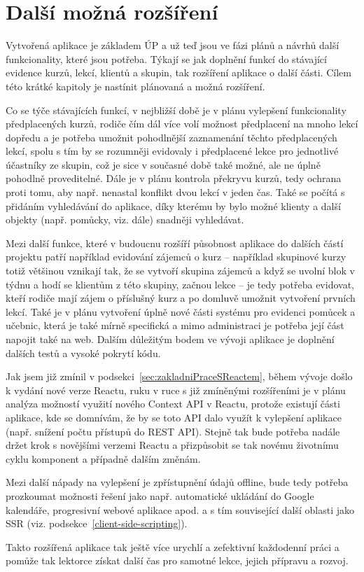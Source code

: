 \chapter{Další možná rozšíření}\label{dalsirozsireni}
Vytvořená aplikace je základem ÚP a už teď jsou ve fázi plánů a návrhů další funkcionality, které jsou potřeba. Týkají se jak doplnění funkcí do stávající evidence kurzů, lekcí, klientů a skupin, tak rozšíření aplikace o další části. Cílem této krátké kapitoly je nastínit plánovaná a možná rozšíření.

Co se týče stávajících funkcí, v nejbližší době je v plánu vylepšení funkcionality předplacených kurzů, rodiče čím dál více volí možnost předplacení na mnoho lekcí dopředu a je potřeba umožnit pohodlnější zaznamenání těchto předplacených lekcí, spolu s tím by se rozumněji evidovaly i předplacené lekce pro jednotlivé účastníky ze skupin, což je sice v současné době také možné, ale ne úplně pohodlně proveditelné. Dále je v plánu kontrola překryvu kurzů, tedy ochrana proti tomu, aby např. nenastal konflikt dvou lekcí v jeden čas. Také se počítá s přidáním vyhledávání do aplikace, díky kterému by bylo možné klienty a další objekty (např. pomůcky, viz. dále) snadněji vyhledávat.

Mezi další funkce, které v budoucnu rozšíří působnost aplikace do dalších částí projektu patří například evidování zájemců o kurz -- například skupinové kurzy totiž většinou vznikají tak, že se vytvoří skupina zájemců a když se uvolní blok v týdnu a hodí se klientům z této skupiny, začnou lekce -- je tedy potřeba evidovat, kteří rodiče mají zájem o příslušný kurz a po domluvě umožnit vytvoření prvních lekcí. Také je v plánu vytvoření úplně nové části systému pro evidenci pomůcek a učebnic, která je také mírně specifická a mimo administraci je potřeba její část napojit také na web. Dalším důležitým bodem ve vývoji aplikace je doplnění dalších testů a vysoké pokrytí kódu.

Jak jsem již zmínil v podsekci~\ref{sec:zakladniPraceSReactem}, během vývoje došlo k vydání nové verze Reactu, ruku v ruce s již zmíněnými rozšířeními je v plánu analýza možností využití nového Context API v Reactu, protože existují části aplikace, kde se domnívám, že by se toto API dalo využít k vylepšení aplikace (např. snížení počtu přístupů do REST API). Stejně tak bude potřeba nadále držet krok s novějšími verzemi Reactu a přizpůsobit se tak novému životnímu cyklu komponent a případně dalším změnám.

Mezi další nápady na vylepšení je zpřístupnění údajů offline, bude tedy potřeba prozkoumat možnosti řešení jako např. automatické ukládání do Google kalendáře, progresivní webové aplikace apod. a s tím související další oblasti jako SSR (viz. podsekce~\ref{client-side-scripting}).

Takto rozšířená aplikace tak ještě více urychlí a zefektivní každodenní práci a pomůže tak lektorce získat další čas pro samotné lekce, jejich přípravu a rozvoj.
